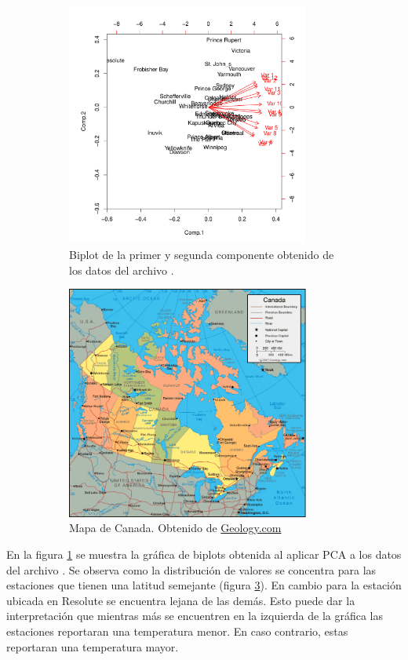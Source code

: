 \begin{figure}[H]
    \centering
    \begin{subfigure}{8cm}
        \includegraphics[width=8cm]{Graphics/biplot.pdf}
        \caption{Biplot de la primer y segunda componente obtenido de los datos del archivo .}
        \label{fig:biplot}
    \end{subfigure}
    \hspace{0.5cm}
    \begin{subfigure}{8cm}
        \includegraphics[width=8cm]{Graphics/canada-map.png}
        \caption{Mapa de Canada. Obtenido de \href{https://geology.com/world/canada-satellite-image.shtml}{Geology.com}}
        \label{fig:canada_map}
    \end{subfigure}
    \caption{}
\end{figure}

En la figura \ref{fig:biplot} se muestra la gráfica de biplots obtenida al aplicar PCA a los datos del archivo . Se observa como la distribución de valores se concentra para las estaciones que tienen una latitud semejante (figura \ref{fig:canada_map}). En cambio para la estación ubicada en Resolute se encuentra lejana de las demás. Esto puede dar la interpretación que mientras más se encuentren en la izquierda de la gráfica las estaciones reportaran una temperatura menor. En caso contrario, estas reportaran una temperatura mayor.
